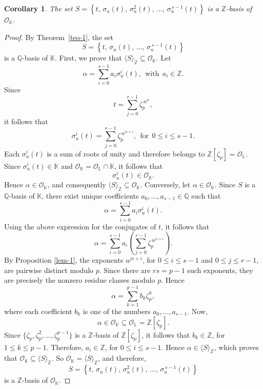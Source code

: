 \documentclass{amsart}
\newtheorem{corollary}[theorem]{Corollary}
\begin{document}
\begin{corollary} \label{cor-1} The set $S=\left\{t,\,\sigma_u(t),\,\sigma_u^{2}(t),\,\ldots,\,\sigma_u^{\,s-1}(t)\right\}$ is a $\mathbb{Z}$-basis of $\mathcal{O}_{\mathbb{K}}$. \end{corollary}
\begin{proof} By Theorem~\ref{teo-1}, the set \[ S = \left\{ t,\,\sigma_u(t),\,\ldots,\,\sigma_u^{\,s-1}(t)\right\} \] is a $\mathbb{Q}$-basis of $\mathbb{K}$.
First, we prove that $\langle S\rangle_{\mathbb{Z}}\subseteq\mathcal{O}_{\mathbb{K}}$. Let \[ \alpha = \sum_{i=0}^{s-1}a_i\sigma_u^i(t), \ \ \mbox{with} \ \  a_i\in\mathbb{Z}. \]
Since \[ t = \sum_{j=0}^{r-1} \zeta_p^{\,u^{js}}, \] it follows that \[ \sigma_u^i(t) = \sum_{j=0}^{r-1} \zeta_p^{\,u^{js+i}}, \ \ \mbox{for} \ \ 0\le i\le s-1. \]
Each $\sigma_u^i(t)$ is a sum of roots of unity and therefore belongs to
$\mathbb{Z}[\zeta_p]=\mathcal{O}_{\mathbb{L}}$. Since $\sigma_u^i(t)\in\mathbb{K}$ and $\mathcal{O}_{\mathbb{K}} = \mathcal{O}_{\mathbb{L}}\cap\mathbb{K}$, it follows that
\[ \sigma_u^i(t)\in\mathcal{O}_{\mathbb{K}}. \] Hence $\alpha\in\mathcal{O}_{\mathbb{K}}$, and consequently $\langle S\rangle_{\mathbb{Z}} \subseteq \mathcal{O}_{\mathbb{K}}$.
Conversely, let $\alpha\in\mathcal{O}_{\mathbb{K}}$. Since $S$ is a $\mathbb{Q}$-basis of $\mathbb{K}$, there exist unique
coefficients $a_0,\ldots,a_{s-1}\in\mathbb{Q}$ such that \[ \alpha = \sum_{i=0}^{s-1} a_i\sigma_u^i(t). \] Using the above expression for the conjugates of $t$, it follows that 
\[ \alpha = \sum_{i=0}^{s-1} a_i \left( \sum_{j=0}^{r-1} \zeta_p^{\,u^{js+i}} \right). \] By Proposition \ref{lem-1}, the exponents $u^{js+i}$, for $0\le i\le s-1$ and $0\le j\le r-1$,
are pairwise distinct modulo $p$. Since there are $rs=p-1$ such exponents, they are precisely the nonzero residue classes modulo $p$. Hence
\[ \alpha = \sum_{k=1}^{p-1} b_k\zeta_p^k, \] where each coefficient $b_k$ is one of the numbers $a_0,\ldots,a_{s-1}$. Now, \[
\alpha\in\mathcal{O}_{\mathbb{K}} \subseteq \mathcal{O}_{\mathbb{L}} = \mathbb{Z}[\zeta_p]. \] Since $\{\zeta_p,\zeta_p^2,\ldots,\zeta_p^{p-1}\}$ is a $\mathbb{Z}$-basis of $\mathbb{Z}[\zeta_p]$, it follows that $b_k\in\mathbb{Z}$, for $1\le k\le p-1$. 
Therefore, $a_i\in\mathbb{Z}$, for $0\le i\le s-1$. Hence $\alpha\in\langle S\rangle_{\mathbb{Z}}$,  which proves that $\mathcal{O}_{\mathbb{K}} \subseteq\langle S\rangle_{\mathbb{Z}}$.
So $\mathcal{O}_{\mathbb{K}} = \langle S\rangle_{\mathbb{Z}}$, and therefore, \[ S= \left\{t,\,\sigma_u(t),\,\sigma_u^{2}(t),\, \ldots,\,\sigma_u^{\,s-1}(t) \right\} \] is a $\mathbb{Z}$-basis of $\mathcal{O}_{\mathbb{K}}$.
\end{proof}
\end{document}
